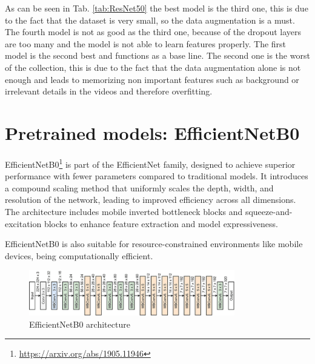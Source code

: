 As can be seen in Tab. \ref{tab:ResNet50} the best model is the third one, this is due to the fact that the dataset is very small, so the data augmentation is a must. The fourth model is not as good as the third one, because of the dropout layers are too many and the model is not able to learn features properly. The first model is the second best and functions as a base line. The second one is the worst of the collection, this is due to the fact that the data augmentation alone is not enough and leads to memorizing non important features such as background or irrelevant details in the videos and therefore overfitting.

\section{Pretrained models: EfficientNetB0}
EfficientNetB0\footnote{\url{https://arxiv.org/abs/1905.11946}} is part of the EfficientNet family, designed to achieve superior performance with fewer parameters compared to traditional models.
It introduces a compound scaling method that uniformly scales the depth, width, and resolution of the network, leading to improved efficiency across all dimensions.
The architecture includes mobile inverted bottleneck blocks and squeeze-and-excitation blocks to enhance feature extraction and model expressiveness.

EfficientNetB0 is also suitable for resource-constrained environments like mobile devices, being computationally efficient. 
\begin{figure}[h!]
    \centering
    \includegraphics[width=0.8\textwidth]{images/EfficientNetB0-architecture-36.png}
    \caption{EfficientNetB0 architecture}
    \label{fig:EfficientNetB0architecture}
\end{figure}

